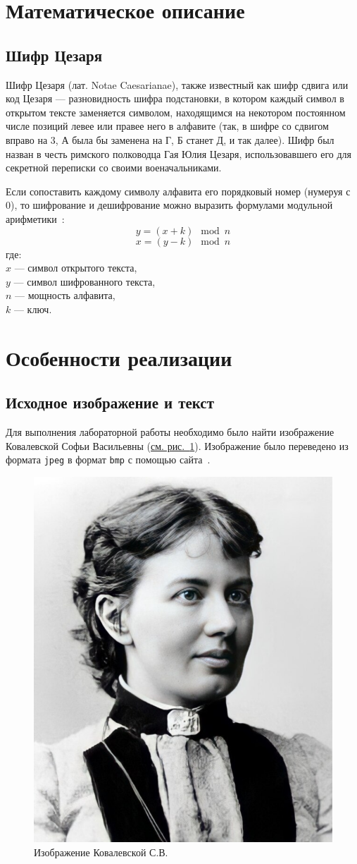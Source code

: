 \documentclass[11pt,a4paper,final]{article} %
\begin{document}
\newpage
\section {Математическое описание}
\subsection{Шифр Цезаря}
Шифр Цезаря (лат. Notae Caesarianae), также известный как шифр сдвига или код Цезаря — разновидность шифра подстановки, в котором каждый символ в открытом тексте заменяется символом, находящимся на некотором постоянном числе позиций левее или правее него в алфавите (так, в шифре со сдвигом вправо на 3, А была бы заменена на Г, Б станет Д, и так далее). Шифр был назван в честь римского полководца Гая Юлия Цезаря, использовавшего его для секретной переписки со своими военачальниками.

Если сопоставить каждому символу алфавита его порядковый номер (нумеруя с 0), то шифрование и дешифрование можно выразить формулами модульной арифметики~\cite{caesar}:
\[
y = (x + k) \mod n
\]
\[
x = (y - k) \mod n
\]
где: \\
$x$ — символ открытого текста, \\
$y$ — символ шифрованного текста, \\
$n$ — мощность алфавита, \\
$k$ — ключ.


\newpage
\section {Особенности реализации}
\subsection{Исходное изображение и текст}
Для выполнения лабораторной работы необходимо было найти изображение Ковалевской Софьи Васильевны (\hyperref[fig:sonya]{см. рис.~\ref{fig:sonya}}). Изображение было переведено из формата \texttt{jpeg} в формат \texttt{bmp} с помощью сайта~\cite{convertio}.

\begin{figure}[H]
	\centering
	\includegraphics[width=0.6 \linewidth]{img/sonya.png}
	\caption{Изображение Ковалевской С.В.}
	\label{fig:sonya}
\end{figure}
\end{document}
